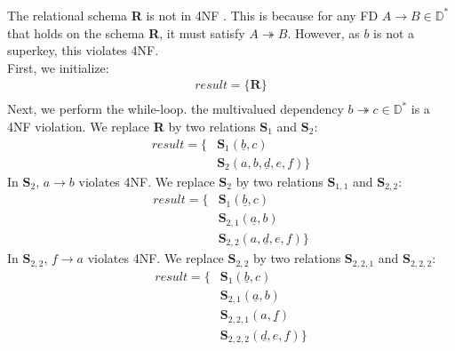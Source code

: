 \documentclass[letterpaper]{article}
\theoremstyle{plain}
\theoremstyle{definition}
\theoremstyle{remark}
\begin{document}
\subsubsection{}
The relational schema \textbf{R} is not in 4NF . This is because for any FD $A\to B\in\mathbb{D}^*$ that holds on the schema \textbf{R}, it must satisfy $A\twoheadrightarrow B$. However, as $b$ is not a superkey, this violates 4NF.\\[1em]
First, we initialize:
\begin{align*}
    \textit{result}=\{\textbf{R}\}\\
\end{align*}
Next, we perform the while-loop. the multivalued dependency $b\twoheadrightarrow c\in\mathbb{D}^*$ is a 4NF violation. We replace \textbf{R} by two relations $\textbf{S}_1$ and $\textbf{S}_2$:
\begin{align*}
    \textit{result}=\{&\textbf{S}_1(\underline{b},c)\\
    &\textbf{S}_2(a,b,\underline{d},e,f)\}
\end{align*}
In $\textbf{S}_2$, $a\to b$ violates 4NF. We replace $\textbf{S}_2$ by two relations $\textbf{S}_{1,1}$ and $\textbf{S}_{2,2}$:
\begin{align*}
    \textit{result}=\{&\textbf{S}_1(\underline{b},c)\\
    &\textbf{S}_{2,1}(\underline{a},b)\\
    &\textbf{S}_{2,2}(a,\underline{d},e,f)\}
\end{align*}
In $\textbf{S}_{2,2}$, $f\to a$ violates 4NF. We replace $\textbf{S}_{2,2}$ by two relations $\textbf{S}_{2,2,1}$ and $\textbf{S}_{2,2,2}$:
\begin{align*}
    \textit{result}=\{&\textbf{S}_1(\underline{b},c)\\
    &\textbf{S}_{2,1}(\underline{a},b)\\
    &\textbf{S}_{2,2,1}(a,\underline{f})\\
    &\textbf{S}_{2,2,2}(\underline{d},e,f)\}
\end{align*}
\section{}
\subsection{}
\end{document}
